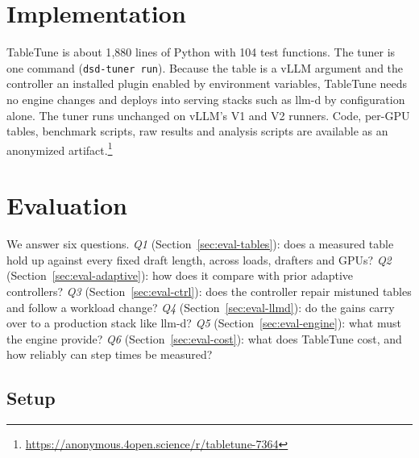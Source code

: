\documentclass{article}
\newcommand{\sys}{TableTune}
\begin{document}
\section{Implementation}
\label{sec:impl}

\sys{} is about 1{,}880 lines of Python with 104 test functions. The tuner is one command (\texttt{dsd-tuner run}). Because the table is a vLLM argument and the controller an installed plugin enabled by environment variables, \sys{} needs no engine changes and deploys into serving stacks such as llm-d by configuration alone. The tuner runs unchanged on vLLM's V1 and V2 runners. Code, per-GPU tables, benchmark scripts, raw results and analysis scripts are available as an anonymized artifact.\footnote{\url{https://anonymous.4open.science/r/tabletune-7364}}

\section{Evaluation}
\label{sec:eval}

We answer six questions. \emph{Q1} (Section~\ref{sec:eval-tables}): does a measured table hold up against every fixed draft length, across loads, drafters and GPUs? \emph{Q2} (Section~\ref{sec:eval-adaptive}): how does it compare with prior adaptive controllers? \emph{Q3} (Section~\ref{sec:eval-ctrl}): does the controller repair mistuned tables and follow a workload change? \emph{Q4} (Section~\ref{sec:eval-llmd}): do the gains carry over to a production stack like llm-d? \emph{Q5} (Section~\ref{sec:eval-engine}): what must the engine provide? \emph{Q6} (Section~\ref{sec:eval-cost}): what does \sys{} cost, and how reliably can step times be measured?

\subsection{Setup}
\label{sec:setup}
\end{document}
